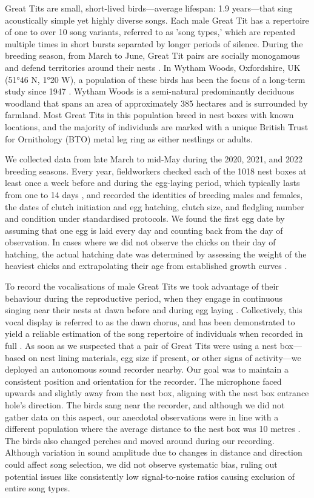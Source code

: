Great Tits are small, short-lived birds---average lifespan: 1.9 years---that sing acoustically simple yet highly diverse songs. Each male Great Tit has a repertoire of one to over 10 song variants, referred to as 'song types,' which are repeated multiple times in short bursts separated by longer periods of silence. During the breeding season, from March to June, Great Tit pairs are socially monogamous and defend territories around their nests \parencite{hinde1952}. In Wytham Woods, Oxfordshire, UK (51°46 N, 1°20 W), a population of these birds has been the focus of a long-term study since 1947 \parencite{lack1964}. Wytham Woods is a semi-natural predominantly deciduous woodland that spans an area of approximately 385 hectares and is surrounded by farmland. Most Great Tits in this population breed in nest boxes with known locations, and the majority of individuals are marked with a unique British Trust for Ornithology (BTO) metal leg ring as either nestlings or adults.

We collected data from late March to mid-May during the 2020, 2021, and 2022 breeding seasons. Every year, fieldworkers checked each of the 1018 nest boxes at least once a week before and during the egg-laying period, which typically lasts from one to 14 days \parencite{Perrins1965}, and recorded the identities of breeding males and females, the dates of clutch initiation and egg hatching, clutch size, and fledgling number and condition under standardised protocols. We found the first egg date by assuming that one egg is laid every day and counting back from the day of observation. In cases where we did not observe the chicks on their day of hatching, the actual hatching date was determined by assessing the weight of the heaviest chicks and extrapolating their age from established growth curves \parencite{cresswell2003, gibb1950}.

To record the vocalisations of male Great Tits we took advantage of their behaviour during the reproductive period, when they engage in continuous singing near their nests at dawn before and during egg laying \parencite{mace1987}. Collectively, this vocal display is referred to as the dawn chorus, and has been demonstrated to yield a reliable estimation of the song repertoire of individuals when recorded in full \parencite{rivera-gutierrez2012, vanduyse2005}. As soon as we suspected that a pair of Great Tits were using a nest box---based on nest lining materials, egg size if present, or other signs of activity---we deployed an autonomous sound recorder nearby. Our goal was to maintain a consistent position and orientation for the recorder. The microphone faced upwards and slightly away from the nest box, aligning with the nest box entrance hole's direction. The birds sang near the recorder, and although we did not gather data on this aspect, our anecdotal observations were in line with a different population where the average distance to the nest box was 10 metres \parencite{halfwerk2012}. The birds also changed perches and moved around during our recording. Although variation in sound amplitude due to changes in distance and direction could affect song selection, we did not observe systematic bias, ruling out potential issues like consistently low signal-to-noise ratios causing exclusion of entire song types.

